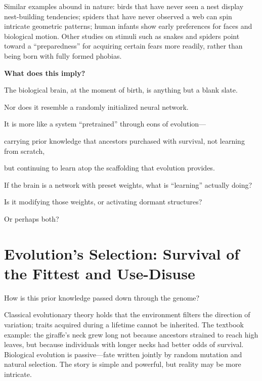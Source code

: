 Similar examples abound in nature: birds that have never seen a nest display nest-building tendencies; spiders that have never observed a web can spin intricate geometric patterns; human infants show early preferences for faces and biological motion. Other studies on stimuli such as snakes and spiders point toward a ``preparedness'' for acquiring certain fears more readily, rather than being born with fully formed phobias.

\vspace{1em}

\textbf{What does this imply?}

The biological brain, at the moment of birth, is anything but a blank slate.

Nor does it resemble a randomly initialized neural network.

It is more like a system ``pretrained'' through eons of evolution---

carrying prior knowledge that ancestors purchased with survival, not learning from scratch,

but continuing to learn atop the scaffolding that evolution provides.

\begin{thinkbox}
If the brain is a network with preset weights, what is ``learning'' actually doing?

Is it modifying those weights, or activating dormant structures?

Or perhaps both?
\end{thinkbox}

\newpage
\section{Evolution's Selection: Survival of the Fittest and Use-Disuse}

How is this prior knowledge passed down through the genome?

Classical evolutionary theory holds that the environment filters the direction of variation; traits acquired during a lifetime cannot be inherited. The textbook example: the giraffe's neck grew long not because ancestors strained to reach high leaves, but because individuals with longer necks had better odds of survival. Biological evolution is passive---fate written jointly by random mutation and natural selection.
The story is simple and powerful, but reality may be more intricate.

\vspace{1em}


